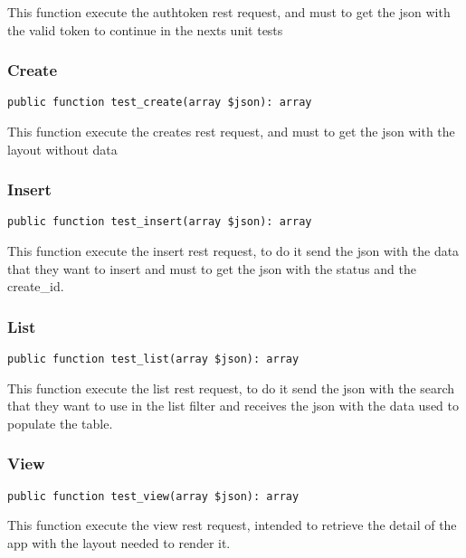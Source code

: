 \documentclass[a4paper]{article}
\begin{document}
This function execute the authtoken rest request, and must to get the
json with the valid token to continue in the nexts unit tests

\hypertarget{toc56}{}
\subsubsection{Create}

\begin{lstlisting}
public function test_create(array $json): array
\end{lstlisting}

This function execute the creates rest request, and must to get the
json with the layout without data

\hypertarget{toc57}{}
\subsubsection{Insert}

\begin{lstlisting}
public function test_insert(array $json): array
\end{lstlisting}

This function execute the insert rest request, to do it send the json with
the data that they want to insert and must to get the json with the status
and the create\_id.

\hypertarget{toc58}{}
\subsubsection{List}

\begin{lstlisting}
public function test_list(array $json): array
\end{lstlisting}

This function execute the list rest request, to do it send the json with
the search that they want to use in the list filter and receives the json
with the data used to populate the table.

\hypertarget{toc59}{}
\subsubsection{View}

\begin{lstlisting}
public function test_view(array $json): array
\end{lstlisting}

This function execute the view rest request, intended to retrieve the detail
of the app with the layout needed to render it.
\end{document}

